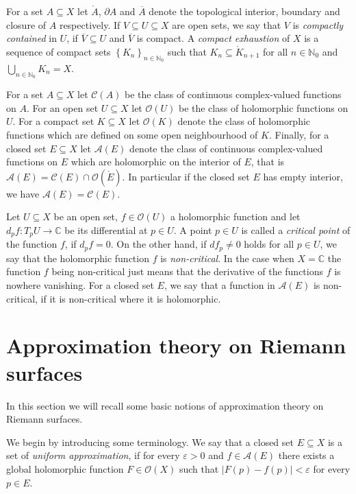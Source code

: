 \documentclass[a4paper,11pt]{amsart}
\newcommand{\N}{\mathbb N}
\newcommand{\C}{\mathbb C}
\newcommand{\set}[1]{\left\{#1\right\}}
\newcommand{\abs}[1]{\left|#1\right|}
\begin{document}
For a set $A \subseteq X$ let $\mathring{A}$, $\partial A$ and $\overline{A}$ denote the topological interior, boundary and closure of $A$ respectively.
If $V \subseteq U \subseteq X$ are open sets, we say that $V$ is \emph{compactly contained} in $U$, if $\overline{V} \subseteq U$ and $\overline{V}$ is compact. 
A \emph{compact exhaustion} of $X$ is a sequence of compact sets $\set{K_n}_{n \in \N_0}$ such that $K_n \subseteq \mathring{K}_{n+1}$ for all $n \in \N_0$ and $\bigcup_{n \in \N_0} K_n = X$. 

For a set $A \subseteq X$ let $\mathcal{C}(A)$ be the class of continuous complex-valued functions on $A$.
For an open set $U \subseteq X$ let $\mathcal{O}(U)$ be the class of holomorphic functions on $U$.
For a compact set $K \subseteq X$ let $\mathcal{O}(K)$ denote the class of holomorphic functions which are defined on some open neighbourhood of $K$.
Finally, for a closed set $E \subseteq X$ let $\mathcal{A}(E)$ denote the class of continuous complex-valued functions on $E$ which are holomorphic on the interior of $E$,
that is $\mathcal{A}(E) = \mathcal{C}(E) \cap \mathcal{O}(\mathring{E})$. In particular if the closed set $E$ has empty interior, we have $\mathcal{A}(E) = \mathcal{C}(E)$.

Let $U \subseteq X$ be an open set, $f \in \mathcal{O}(U)$ a holomorphic function and let $d_pf \colon T_pU \to \C$ be its differential at $p \in U$. 
A point $p \in U$ is called a \emph{critical point} of the function $f$, if $d_pf = 0$.
On the other hand, if $df_p \neq 0$ holds for all $p \in U$, we say that the holomorphic function $f$ is \emph{non-critical}.
In the case when $X = \C$ the function $f$ being non-critical just means that the derivative of the functions $f$ is nowhere vanishing. 
For a closed set $E$, we say that a function in $\mathcal{A}(E)$ is non-critical, if it is non-critical where it is holomorphic.

\section{Approximation theory on Riemann surfaces} \label{ApproximationOnRS}

In this section we will recall some basic notions of approximation theory on Riemann surfaces.

We begin by introducing some terminology.
We say that a closed set $E \subseteq X$ is a set of \emph{uniform approximation}, if for every $\varepsilon > 0$ and $f \in \mathcal{A}(E)$ 
there exists a global holomorphic function $F \in \mathcal{O}(X)$ such that $\abs{F(p)-f(p)} < \varepsilon$ for every $p \in E$.
\end{document}

